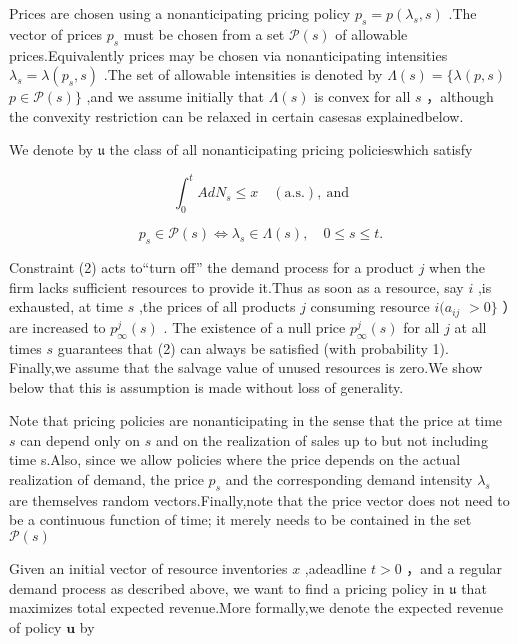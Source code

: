 Prices are chosen using a nonanticipating pricing policy
\(p _ { s } = p ( \lambda _ { s } , s )\) .The vector of prices
\(p _ { s }\) must be chosen from a set \({ \mathcal { P } } ( s )\) of
allowable prices.Equivalently prices may be chosen via nonanticipating
intensities \(\lambda _ { s } = \lambda ( p _ { s } , s )\) .The set of
allowable intensities is denoted by
\(\Lambda ( s ) = \{ \lambda ( p , s )\)
\(p \in \mathcal { P } ( s ) \}\) ,and we assume initially that
\(\Lambda ( s )\) is convex for all \(s\) ，although the convexity
restriction can be relaxed in certain casesas explainedbelow.

We denote by \(\mathfrak { u }\) the class of all nonanticipating
pricing policieswhich satisfy

\[
\int _ { 0 } ^ { t } A d N _ { s } \leqslant x \quad \mathrm { ( a . s . ) , ~ a n d }
\]

\[
p _ { s } \in \mathcal { P } ( s ) \Leftrightarrow \lambda _ { s } \in \Lambda ( s ) , \quad 0 \leqslant s \leqslant t .
\]

Constraint (2) acts to``turn off'' the demand process for a product
\(j\) when the firm lacks sufficient resources to provide it.Thus as
soon as a resource, say \(i\) ,is exhausted, at time \(s\) ,the prices
of all products \(j\) consuming resource \(i ( a _ { i j }\) \(> 0 \}\)
）are increased to \(p _ { \infty } ^ { j } ( s )\) . The existence of a
null price \(p _ { \infty } ^ { j } ( s )\) for all \(j\) at all times
\(s\) guarantees that (2) can always be satisfied (with probability 1).
Finally,we assume that the salvage value of unused resources is zero.We
show below that this is assumption is made without loss of generality.

Note that pricing policies are nonanticipating in the sense that the
price at time \(s\) can depend only on \(s\) and on the realization of
sales up to but not including time s.Also, since we allow policies where
the price depends on the actual realization of demand, the price
\(p _ { s }\) and the corresponding demand intensity \(\lambda _ { s }\)
are themselves random vectors.Finally,note that the price vector does
not need to be a continuous function of time; it merely needs to be
contained in the set \(\mathcal { P } ( s )\)

Given an initial vector of resource inventories \(x\) ,adeadline
\(t > 0\) ，and a regular demand process as described above, we want to
find a pricing policy in \(\mathfrak { u }\) that maximizes total
expected revenue.More formally,we denote the expected revenue of policy
\(\boldsymbol { u }\) by

